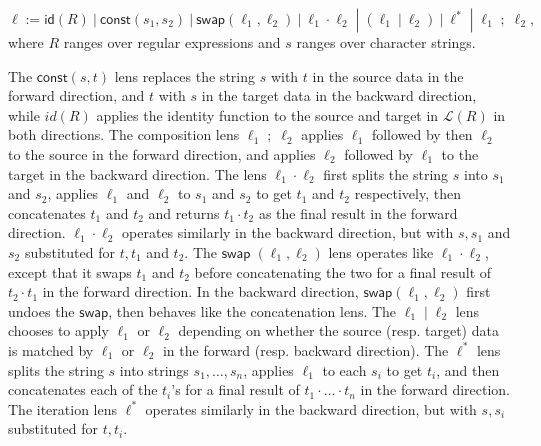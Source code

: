\documentclass[acmsmall,review,anonymous]{acmart}
\newcommand{\codefont}[1]{\ensuremath{\mathsf{#1}}}
\newcommand{\kw}[1]{\codefont{#1}}
\newcommand{\sep}{\ensuremath{\ | \ }}
\newcommand{\const}{\ensuremath{\kw{const}}}
\newcommand{\swap}{\ensuremath{\kw{swap}}}
\newcommand{\id}{\ensuremath{\kw{id}}}
\begin{document}
$$\ell := \id(R) \sep \const(s_1, s_2) \sep  \swap(\ell_1, \ell_2)
\sep \ell_1 \cdot \ell_2 \; |  \; (\ell_1 \sep \ell_2) \sep \ell^* \; | \;
\ell_1 \; ; \;  \ell_2,$$ where $R$ ranges over regular expressions and $s$
ranges over character strings.

The $\mathit{\const}(s, t)$ lens replaces the string $s$ with $t$ in the source
data in the forward direction, and $t$ with $s$ in the target data in the
backward direction, while $\mathit{id}(R)$ applies the identity function to the
source and target  in $\mathcal{L}(R)$ in both directions. The composition lens
$\ell_1 \; ; \; \ell_2$ applies $\ell_1$ followed by then $\ell_2$ to the
source in the forward direction, and applies $\ell_2$ followed by $\ell_1$ to
the target in the backward direction. The lens $\ell_1 \cdot \ell_2$ first
splits the string $s$ into $s_1$ and $s_2$, applies $\ell_1$ and $\ell_2$ to
$s_1$ and $s_2$ to get $t_1$ and $t_2$ respectively, then concatenates $t_1$
and $t_2$ and returns $t_1 \cdot t_2$ as the final result in the forward
direction. $\ell_1 \cdot \ell_2$ operates similarly in the backward direction,
but with $s, s_1$ and $s_2$ substituted for $t, t_1$ and $t_2$. The
$\mathit{\swap} \; (\ell_1, \ell_2)$ lens operates like $\ell_1 \cdot \ell_2$,
except that it swaps $t_1$ and $t_2$ before concatenating the two for a final
result of $t_2 \cdot t_1$ in the forward direction. In the backward direction,
$\mathit{\swap}(\ell_1, \ell_2)$ first undoes the \swap, then behaves like
the concatenation lens. The $\ell_1 \; | \; \ell_2$ lens chooses to apply
$\ell_1$ or $\ell_2$ depending on whether the source (resp. target) data is
matched by $\ell_1$ or $\ell_2$ in the forward (resp. backward direction). The
$\ell^*$ lens splits the string $s$ into strings $s_1, \ldots, s_n$, applies
$\ell_1$ to each $s_i$ to get $t_i$, and then concatenates each of the $t_i$'s
for a final result of $t_1 \cdot \ldots \cdot t_n$ in the forward direction.
The iteration lens $\ell^*$ operates similarly in the backward direction, but
with $s, s_i$ substituted for $t, t_i$.
\end{document}

